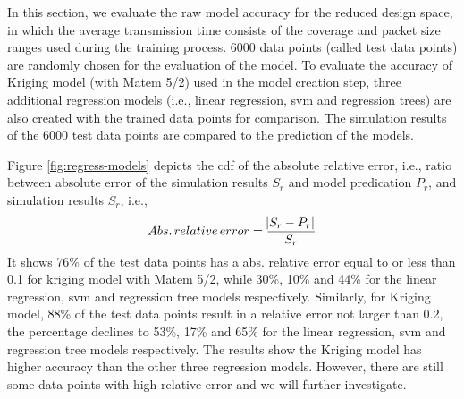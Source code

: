 In this section, we evaluate the \gls{raw} model accuracy for the reduced design space, in which the average transmission time consists of the coverage and packet size ranges used during the training process. 
6000 data points (called test data points) are randomly chosen for the evaluation of the model. To evaluate the accuracy of Kriging model (with Matem 5/2) used in the model creation step, three additional regression models (i.e., linear regression, \gls{svm} and regression trees) are also created with the trained data points for comparison. The simulation results of the 6000 test data points are compared to the prediction of the models. 



Figure \ref{fig:regress-models} depicts the \gls{cdf} of the absolute relative error, i.e., ratio between absolute error of the simulation results $S_r$ and model predication $P_r$, and simulation results $S_r$, i.e., 
\begin{equation}
Abs. \thinspace relative \thinspace error = \frac{\abs{S_r - P_r} }{S_r} 
\end{equation}
It shows 76\% of the test data points has a abs. relative error equal to or less than 0.1 for kriging model with Matem 5/2, while 30\%, 10\% and 44\% for the linear regression, \gls{svm} and regression tree models respectively. Similarly,  for Kriging model, 88\% of the test data points result in  a relative error not larger than 0.2, the percentage declines to 53\%, 17\% and 65\% for the linear regression, \gls{svm} and regression tree models respectively. The results show the Kriging model has higher accuracy than the other three regression models. However, there are still some data points with high relative error and we will further investigate. 


